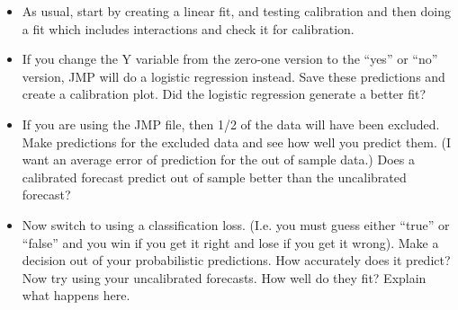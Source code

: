 \documentclass[12pt]{extarticle}
\begin{document}
\begin{itemize}
\item As usual, start by creating a linear fit, and testing
  calibration and then doing a fit which includes interactions and
  check it for calibration.
\item If you change the Y variable from the zero-one version to the
  ``yes'' or ``no'' version, JMP will do a logistic regression
  instead.  Save these predictions and create a calibration plot.  Did
  the logistic regression generate a better fit?
\item If you are using the JMP file, then 1/2 of the data will have
  been excluded.  Make predictions for the excluded data and see how
  well you predict them.  (I want an average error of prediction for
  the out of sample data.)  Does a calibrated forecast predict out of
  sample better than the uncalibrated forecast?
\item Now switch to using a classification loss. (I.e. you must guess
  either ``true'' or ``false'' and you win if you get it right and
  lose if you get it wrong).  Make a decision out of your
  probabilistic predictions.  How accurately does it predict?  Now try
  using your uncalibrated forecasts.  How well do they fit?  Explain
  what happens here.
\end{itemize}
\end{document}
